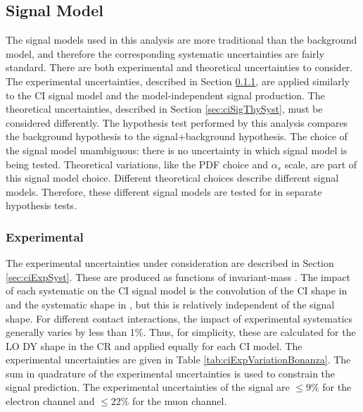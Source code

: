\subsection{Signal Model}\label{sec:ciSystSig}
The signal models used in this analysis are more traditional than the background model, and therefore the corresponding systematic uncertainties are fairly standard.
There are both experimental and theoretical uncertainties to consider.
The experimental uncertainties, described in Section \ref{sec:ciSigExpSyst}, are applied similarly to the CI signal model and the model-independent signal production.
The theoretical uncertainties, described in Section \ref{sec:ciSigThySyst}, must be considered differently.
The hypothesis test performed by this analysis compares the background hypothesis to the signal+background hypothesis.
The choice of the signal model unambiguous: there is no uncertainty in which signal model is being tested.
Theoretical variations, like the PDF choice and $\alpha_s$ scale, are part of this signal model choice.
Different theoretical choices describe different signal models.
Therefore, these different signal models are tested for in separate hypothesis tests.

\subsubsection{Experimental}\label{sec:ciSigExpSyst}

The experimental uncertainties under consideration are described in Section \ref{sec:ciExpSyst}.
These are produced as functions of invariant-mass \mll.
The impact of each systematic on the CI signal model is the convolution of the CI shape in \mll and the systematic shape in \mll, but this is relatively independent of the signal shape.
For different contact interactions, the impact of experimental systematics generally varies by less than 1\%.
Thus, for simplicity, these are calculated for the LO DY shape in the CR and applied equally for each CI model.
The experimental uncertainties are given in Table \ref{tab:ciExpVariationBonanza}.
The sum in quadrature of the experimental uncertainties is used to constrain the signal prediction.
The experimental uncertainties of the signal are $\leq 9\%$ for the electron channel and $\leq 22\%$ for the muon channel.

